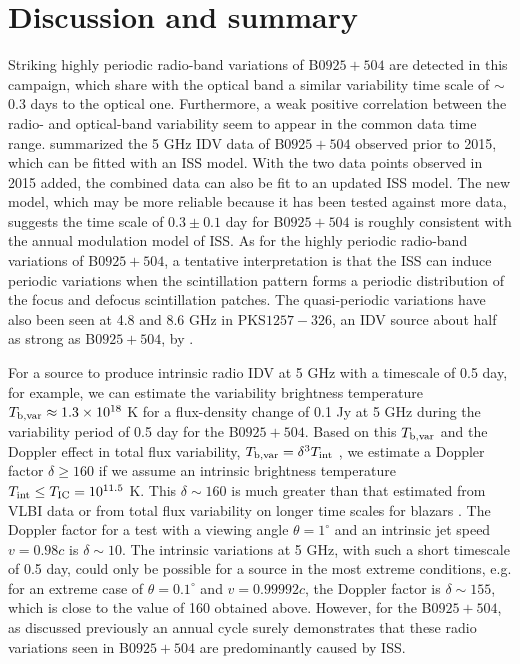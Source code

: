 \documentclass[a4paper,fleqn,usenatbib]{mnras}
\begin{document}
\section{Discussion and summary}

Striking highly periodic radio-band variations of B\(0925+504\) are detected in this campaign, which share with the optical band a similar variability time scale of \(\sim\)0.3 days to the optical one. Furthermore, a weak positive correlation between the radio- and optical-band variability seem to appear in the common data time range. \cite{liu15} summarized the 5 GHz IDV data of B\(0925+504\) observed prior to 2015, which can be fitted with an ISS model. With the two data points observed in 2015 added, the combined data can also be fit to an updated ISS model. The new model, which may be more reliable because it has been tested against more data, suggests the time scale of \(0.3\pm0.1\) day for B\(0925+504\) is roughly consistent with the annual modulation model of ISS. As for the highly periodic radio-band variations of B\(0925+504\), a tentative interpretation is that the ISS can induce periodic variations when the scintillation pattern forms a periodic distribution of the focus and defocus scintillation patches. The quasi-periodic variations have also been seen at 4.8 and 8.6 GHz in PKS\(1257-326\), an IDV source about half as strong as B\(0925+504\),  by \cite{big03}.


For a source to produce intrinsic radio IDV at 5 GHz with a timescale of 0.5 day, for example, we can estimate the variability brightness temperature \(T_{\rm b,var}\approx1.3\times 10^{18}\) K \citep{wag95} for a flux-density change of 0.1 Jy at 5 GHz during the variability period of 0.5 day for the B\(0925+504\). Based on this \(T_{\rm  b,var}\) and the Doppler effect in total flux variability, \(T_{\rm  b,var}=\delta^{3} T_{\rm int}\) \citep{hov09}, we estimate a Doppler factor \(\delta\ge160\) if we assume an intrinsic brightness temperature \(T_{\rm int}\leq T_{\rm IC}=10^{11.5}\) K. This \(\delta\sim160\) is much greater than that estimated from VLBI data or from total flux variability on longer time scales for blazars \citep[\(\delta<30\),][]{laht99,hov09,sav10,liod17}. The Doppler factor for a test with a viewing angle \(\theta=1^{\circ}\) and an intrinsic jet speed \(v=0.98c\) is \(\delta\sim10\). The intrinsic variations at 5 GHz, with such a short timescale of 0.5 day, could only be possible for a source in the most extreme conditions, e.g. for an extreme case of \(\theta=0.1^{\circ}\) and \(v=0.99992c\), the Doppler factor is \(\delta\sim155\), which is close to the value of 160 obtained above. However, for the B\(0925+504\), as discussed previously an annual cycle surely demonstrates that these radio variations seen in B\(0925+504\) are predominantly caused by ISS.
\end{document}
